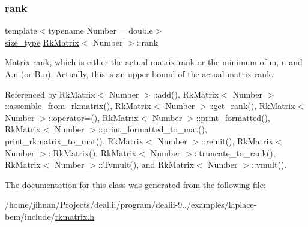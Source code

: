 \mbox{\label{classRkMatrix_aa9e60bb24bbe3ab1750f970f296d8256}} 
\subsubsection{\texorpdfstring{rank}{rank}}
{\footnotesize\ttfamily template$<$typename Number = double$>$ \\
\hyperlink{classRkMatrix_add060bfc3a4cc77f858c3d6dd58cadd5}{size\+\_\+type} \hyperlink{classRkMatrix}{Rk\+Matrix}$<$ Number $>$\+::rank\hspace{0.3cm}{\ttfamily [private]}}

Matrix rank, which is either the actual matrix rank or the minimum of {\ttfamily m}, {\ttfamily n} and {\ttfamily A.\+n} (or {\ttfamily B.\+n}). Actually, this is an upper bound of the actual matrix rank. 

Referenced by Rk\+Matrix$<$ Number $>$\+::add(), Rk\+Matrix$<$ Number $>$\+::assemble\+\_\+from\+\_\+rkmatrix(), Rk\+Matrix$<$ Number $>$\+::get\+\_\+rank(), Rk\+Matrix$<$ Number $>$\+::operator=(), Rk\+Matrix$<$ Number $>$\+::print\+\_\+formatted(), Rk\+Matrix$<$ Number $>$\+::print\+\_\+formatted\+\_\+to\+\_\+mat(), print\+\_\+rkmatrix\+\_\+to\+\_\+mat(), Rk\+Matrix$<$ Number $>$\+::reinit(), Rk\+Matrix$<$ Number $>$\+::\+Rk\+Matrix(), Rk\+Matrix$<$ Number $>$\+::truncate\+\_\+to\+\_\+rank(), Rk\+Matrix$<$ Number $>$\+::\+Tvmult(), and Rk\+Matrix$<$ Number $>$\+::vmult().



The documentation for this class was generated from the following file\+:\begin{DoxyCompactItemize}
\item 
/home/jihuan/\+Projects/deal.\+ii/program/dealii-\/9../examples/laplace-\/bem/include/\hyperlink{rkmatrix_8h}{rkmatrix.\+h}\end{DoxyCompactItemize}
